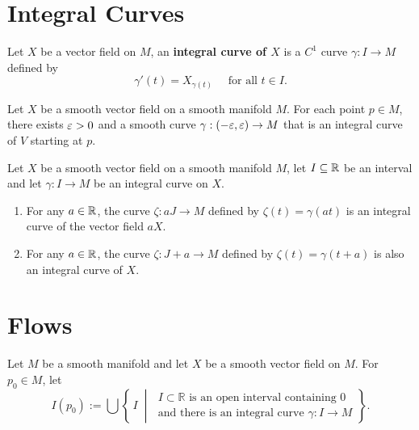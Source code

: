 \section{Integral Curves}
\begin{definition}
    Let $X$ be a vector field on $M$, an \textbf{integral curve of $X$} is a $C^1$ curve $\gamma: I \to M$ defined by
    \[
        \gamma'(t) = X_{\gamma(t)} \quad \text{ for all }t \in I.
    \]
\end{definition}
\begin{proposition}
    Let $X$ be a smooth vector field on a smooth manifold $M$. For each point $p \in M$, there exists $\varepsilon > 0$ and a smooth curve $\gamma: (-\varepsilon, \varepsilon) \to M$ that is an integral curve of $V$ starting at $p$.
\end{proposition}
\begin{lemma}
    Let $X$ be a smooth vector field on a smooth manifold $M$, let $I \subseteq \mathbb{R}$ be an interval and let $\gamma: I \to M$ be an integral curve on $X$. 
    \begin{enumerate}
        \item For any $a \in \mathbb{R}$, the curve $\zeta: aJ \to M$ defined by $\zeta(t) = \gamma(at)$ is an integral curve of the vector field $aX$.
        \item For any $a \in \mathbb{R}$, the curve $\zeta: J + a\to M$ defined by $\zeta(t) = \gamma(t + a)$ is also an integral curve of $X$.
    \end{enumerate}
\end{lemma}
\section{Flows}
\begin{definition}
    Let $M$ be a smooth manifold and let $X$ be a smooth vector field on $M$. For $p_0 \in M$, let 
    \[
        I(p_0) := \bigcup \left\{
        \, I \;\middle|\;
        \begin{array}{l}
        I \subset \mathbb{R} \text{ is an open interval containing } 0 \\
        \text{and there is an integral curve } \gamma : I \to M 
        \end{array}
        \right\}.
    \]
\end{definition}
